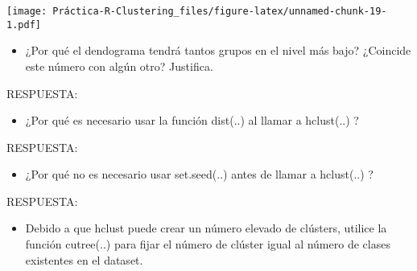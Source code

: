 \documentclass[
]{article}
\newenvironment{Shaded}{\begin{snugshade}}{\end{snugshade}}
\newcommand{\CommentTok}[1]{\textcolor[rgb]{0.56,0.35,0.01}{\textit{#1}}}
\newcommand{\DataTypeTok}[1]{\textcolor[rgb]{0.13,0.29,0.53}{#1}}
\newcommand{\DecValTok}[1]{\textcolor[rgb]{0.00,0.00,0.81}{#1}}
\newcommand{\KeywordTok}[1]{\textcolor[rgb]{0.13,0.29,0.53}{\textbf{#1}}}
\newcommand{\NormalTok}[1]{#1}
\newcommand{\OperatorTok}[1]{\textcolor[rgb]{0.81,0.36,0.00}{\textbf{#1}}}
\newcommand{\StringTok}[1]{\textcolor[rgb]{0.31,0.60,0.02}{#1}}
\providecommand{\tightlist}{%
  \setlength{\itemsep}{0pt}\setlength{\parskip}{0pt}}
\begin{document}
\texttt{[image: Práctica-R-Clustering\_files/figure-latex/unnamed-chunk-19-1.pdf]}

\begin{itemize}
\tightlist
\item
  ¿Por qué el dendograma tendrá tantos grupos en el nivel más bajo?
  ¿Coincide este número con algún otro? Justifica.
\end{itemize}

RESPUESTA:

\begin{itemize}
\tightlist
\item
  ¿Por qué es necesario usar la función dist(..) al llamar a hclust(..)
  ?
\end{itemize}

RESPUESTA:

\begin{itemize}
\tightlist
\item
  ¿Por qué no es necesario usar set.seed(..) antes de llamar a
  hclust(..) ?
\end{itemize}

RESPUESTA:

\begin{itemize}
\tightlist
\item
  Debido a que hclust puede crear un número elevado de clústers, utilice
  la función cutree(..) para fijar el número de clúster igual al número
  de clases existentes en el dataset.
\end{itemize}

\begin{Shaded}
\end{Shaded}
\end{document}
